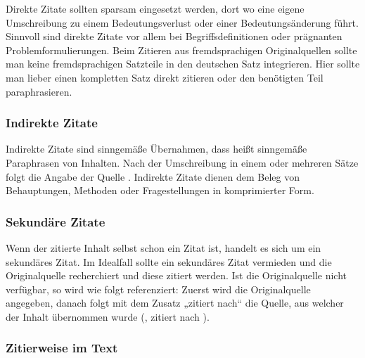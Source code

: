 Direkte Zitate sollten sparsam eingesetzt werden, dort wo eine eigene Umschreibung zu einem Bedeutungsverlust oder einer Bedeutungsänderung führt. Sinnvoll sind direkte Zitate vor allem bei Begriffsdefinitionen oder prägnanten Problemformulierungen. Beim Zitieren aus fremdsprachigen Originalquellen sollte man keine fremdsprachigen Satzteile  in den deutschen Satz integrieren. Hier sollte man lieber einen kompletten Satz direkt zitieren oder den benötigten Teil paraphrasieren.

\subsubsection{Indirekte Zitate}\label{subsubsec:indirekte}

Indirekte Zitate sind sinngemäße Übernahmen, dass heißt sinngemäße Paraphrasen von Inhalten. Nach der Umschreibung in einem oder mehreren Sätze folgt die Angabe der Quelle \cite[S. 11]{mustermann2013test}. Indirekte Zitate dienen dem Beleg von Behauptungen, Methoden oder Fragestellungen in komprimierter Form.

\subsubsection{Sekundäre Zitate}\label{subsubsec:sekundäre}

Wenn der zitierte Inhalt selbst schon ein Zitat ist, handelt es sich um ein sekundäres Zitat. Im Idealfall sollte ein sekundäres Zitat vermieden und die Originalquelle recherchiert und diese zitiert werden. Ist die Originalquelle nicht verfügbar, so wird wie folgt referenziert: Zuerst wird die Originalquelle angegeben, danach folgt mit dem Zusatz „zitiert nach“ die Quelle, aus welcher der Inhalt übernommen wurde (\citealp[S. 11]{mustermann2013test}, zitiert nach \citealp[S. 11]{huber2013buch}).

\subsubsection{Zitierweise im Text}\label{subsubsec:zitierweise}

